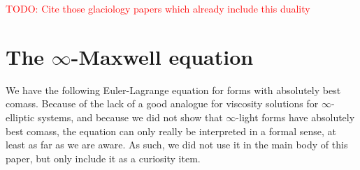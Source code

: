 \documentclass[reqno,11pt]{amsart}
\newcommand*\dif{\mathop{}\!\mathrm{d}}
\theoremstyle{definition}
\numberwithin{equation}{section}
\newcommand\todo[1]{\textcolor{red}{TODO: #1}}
\begin{document}
\todo{Cite those glaciology papers which already include this duality}

\section{The \texorpdfstring{$\infty$-Maxwell equation}{infinity-Maxwell equation}}\label{EulerLagrange}
We have the following Euler-Lagrange equation for forms with absolutely best comass.
Because of the lack of a good analogue for viscosity solutions for $\infty$-elliptic systems, and because we did not show that $\infty$-light forms have absolutely best comass, the equation can only really be interpreted in a formal sense, at least as far as we are aware.
As such, we did not use it in the main body of this paper, but only include it as a curiosity item.

\end{document}
